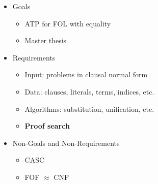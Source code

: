 \begin{itemize}
	\item Goals
	\begin{itemize}
		\item ATP for {FOL} with equality
		\item Master thesis
	\end{itemize}
	\item Requirements
	\begin{itemize}
		\item Input: problems in clausal normal form
		\item Data: clauses, literals, terms, indices, etc.
		\item Algorithms: substitution, unification, etc.
		\item \textbf{Proof search}
	\end{itemize}
	\item Non-Goals and Non-Requirements
	\begin{itemize}
		\item CASC
		\item FOF $\approx$ CNF
	\end{itemize}
\end{itemize}
